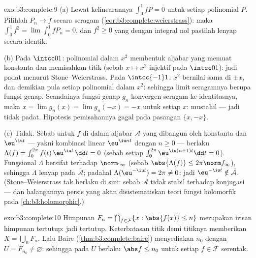 \begin{solution}{exo:b3:complete:9}
(a) Lewat kelinearannya $\int_0^1 fP = 0$ untuk setiap polinomial $P$.
Pilihlah $P_n \to f$ secara seragam
(\cref{cor:b3:complete:weierstrass}): maka $\int_0^1 f^2 =
\lim\int_0^1 fP_n = 0$, dan $f^2 \geq 0$ yang  dengan
integral nol pastilah lenyap secara identik.

(b) Pada $\intcc01$: polinomial dalam $x^2$ membentuk aljabar
yang memuat konstanta dan memisahkan titik (sebab $x \mapsto x^2$ injektif
pada $\intcc01$): jadi padat menurut Stone--Weierstrass. Pada $\intcc{-1}1$:
$x^2$ bernilai sama di $\pm x$, dan demikian pula setiap
polinomial dalam $x^2$: sehingga limit seragamnya berupa fungsi
genap. Seandainya fungsi genap $g_n$ konvergen seragam ke
identitasnya, maka $x = \lim g_n(x) = \lim g_n(-x) = -x$ untuk setiap
$x$: mustahil --- jadi tidak padat. Hipotesis pemisahannya gagal pada
pasangan $\{x, -x\}$.

(c) Tidak. Sebab untuk $f$ di dalam aljabar $\mathcal A$ yang dibangun oleh
konstanta dan $\eu^{\iu t}$ --- yakni kombinasi linear
$\eu^{\iu nt}$ dengan $n \geq 0$ --- berlaku $\Lambda(f) =
\int_0^{2\pi}f(t)\,\eu^{\iu t}\,\dd t = 0$ (sebab setiap
$\int_0^{2\pi}\eu^{\iu(n+1)t}\dd t = 0$). Fungsional $\Lambda$ bersifat
 terhadap $\norm\cdot_\infty$ (sebab $\abs{\Lambda(f)}\leq
2\pi\norm f_\infty$), sehingga $\Lambda$ lenyap pada $\bar{\mathcal
A}$; padahal $\Lambda(\eu^{-\iu t}) = 2\pi \neq 0$: jadi $\eu^{-\iu t}
\notin \bar{\mathcal A}$. (Stone--Weierstrass tak berlaku di sini:
sebab $\mathcal A$ tidak stabil terhadap konjugasi --- dan halangannya persis
yang akan disistematiskan teori fungsi holomorfik pada \cref{ch:b3:holomorphic}.)
\end{solution}

\begin{solution}{exo:b3:complete:10}
Himpunan $F_n = \bigcap_{f \in \mathcal F}\{x : \abs{f(x)} \leq n\}$ merupakan
irisan himpunan tertutup: jadi tertutup. Keterbatasan titik demi titiknya
memberikan $X = \bigcup_n F_n$. Lalu Baire (\cref{thm:b3:complete:baire})
menyediakan $n_0$ dengan $U = \mathring F_{n_0} \neq \varnothing$:
sehingga pada $U$ berlaku $\abs f \leq n_0$ untuk setiap $f \in \mathcal F$
serentak.
\end{solution}

